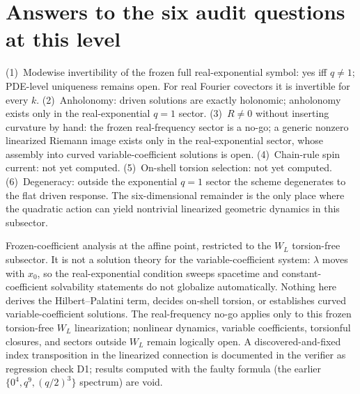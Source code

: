 \documentclass[11pt,a4paper]{article}
\begin{document}
\section{Answers to the six audit questions at this level}
(1)~Modewise invertibility of the frozen full real-exponential symbol:
yes iff $q\neq1$; PDE-level uniqueness remains open.  For real Fourier
covectors it is invertible for every $k$.
(2)~Anholonomy: driven solutions are exactly holonomic; anholonomy exists
only in the real-exponential $q=1$ sector.
(3)~$R\neq0$ without inserting curvature by hand: the frozen
real-frequency sector is a no-go; a generic nonzero linearized Riemann
image exists only in the real-exponential sector, whose assembly into
curved variable-coefficient solutions is open.
(4)~Chain-rule spin current: not yet computed.
(5)~On-shell torsion selection: not yet computed.
(6)~Degeneracy: outside the exponential $q=1$ sector the scheme
degenerates to the flat driven response.  The six-dimensional remainder
is the only place where the quadratic action can yield nontrivial
linearized geometric dynamics in this subsector.

\begin{tcolorbox}[colback=orange!6!white,colframe=orange!70!black,
title=Scope and non-claims]
Frozen-coefficient analysis at the affine point, restricted to the
$W_L$ torsion-free subsector.  It is not a solution theory for the
variable-coefficient system: $\lambda$ moves with $x_0$, so the
real-exponential condition sweeps spacetime and constant-coefficient
solvability statements do not globalize automatically.  Nothing here
derives the Hilbert--Palatini term, decides on-shell torsion, or
establishes curved variable-coefficient solutions.  The real-frequency
no-go applies only to this frozen torsion-free $W_L$ linearization;
nonlinear dynamics, variable coefficients, torsionful closures, and
sectors outside $W_L$ remain logically open.  A discovered-and-fixed
index transposition in the linearized connection is documented in the
verifier as regression check D1; results computed with the faulty
formula (the earlier $\{0^4,q^9,(q/2)^3\}$ spectrum) are void.
\end{tcolorbox}
\end{document}
